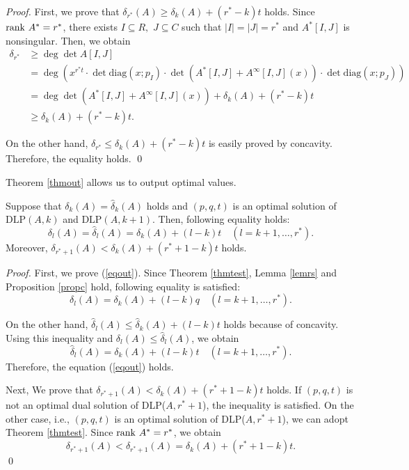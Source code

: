 \begin{proof}
First, we prove that $ \delta_{r^{\ast}} (A) \ge \delta_k (A) + ( r^{\ast} - k ) t $ holds.
Since $ \mathrm{rank} \  A^{\ast} = r^{\ast} $, 
there exists $ I \subseteq R,$ $ J \subseteq C $ such that $|I| = |J| = r^{\ast} $ 
and $ A^{\ast} [I,J] $ is nonsingular. 
Then, we obtain 
\begin{align*}
\delta_{r^{\ast}}
& \ge \deg \det A[I,J]\\
&= \deg \left(x^{r^{\ast} t} \cdot \det \mathrm{diag} (x;p_I) \cdot \det ( A^{\ast} [I,J] + A^{\infty}[I,J](x) ) \cdot \det \mathrm{diag} (x;p_J) \right)\\
&= \deg \det ( A^{\ast} [I,J] + A^{\infty}[I,J](x) ) + \delta_k (A) + (r^{\ast} - k ) t \\
& \ge \delta_k (A) + (r^{\ast}-k) t.
\end{align*}

On the other hand, 
$ \delta_{r^{\ast}} \le \delta_k (A) + (r^{\ast} - k ) t $ is easily proved by concavity.
Therefore, the equality holds. \qed
\end{proof}

Theorem \ref{thmout} allows us to output optimal values. 

\begin{theorem}
Suppose that $ \delta_k (A) = \hat{\delta}_k (A) $ holds 
and $ (p,q,t) $ is an optimal solution of $ \mathrm{DLP}(A,k)$ and $\mathrm{DLP}(A,k+1) $. 
Then, following equality holds:
\begin{equation}
\delta_l (A) = \hat{\delta}_l (A) = \delta_k (A) + ( l - k ) t \quad ( l = k+1,\dots,r^{\ast}). \label{eqout}
\end{equation}
Moreover, $ \delta_{r^{\ast}+1} (A) < \delta_k (A) + ( r^{\ast} + 1 - k ) t $ holds.
\label{thmout}
\end{theorem}


\begin{proof}
First, we prove (\ref{eqout}).
Since Theorem \ref{thmtest}, 
Lemma \ref{lemrs} and Proposition \ref{propc} hold, 
following equality is satisfied:
\begin{equation}
\delta_l (A) = \delta_k (A) + ( l - k ) q \quad ( l = k+ 1, \dots, r^{\ast}).
\end{equation}

On the other hand, 
$ \hat{\delta}_l (A) \le  \hat{\delta}_k (A) + ( l - k) t $ holds because of concavity. 
Using this inequality and $ \delta_l (A) \le \hat{\delta}_l (A) $, we obtain
\[ \hat{\delta}_l (A) = \delta_k (A) + ( l - k ) t \quad ( l = k+1,\dots,r^{\ast}). \]
Therefore, the equation (\ref{eqout}) holds.

Next, We prove that $ \delta_{r^{\ast}+1} (A) < \delta_k (A) + ( r^{\ast} + 1 - k ) t $ holds. 
If $ (p,q,t) $ is not an optimal dual solution of DLP($A,r^{\ast}+1$), the inequality is satisfied.
On the other case, i.e., $(p,q,t)$ is an optimal solution of DLP($A,r^{\ast}+1$), 
we can adopt Theorem \ref{thmtest}. Since $ \mathrm{rank} \  A^{\ast} = r^{\ast} $, we obtain
\[ \delta_{r^{\ast}+1} (A) < \hat{\delta}_{r^{\ast}+1} (A) = \delta_k (A) + ( r^{\ast} +1 - k) t. \]
\qed
\end{proof}


